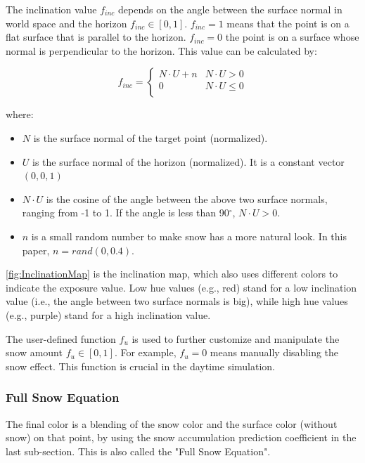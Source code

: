 \documentclass{article}
\begin{document}
The inclination value \( f_{inc} \) depends on the angle between the surface normal in world space and the
horizon \( f_{inc} \in [0, 1] \). \( f_{inc}=1 \) means that the point is on a flat surface that is parallel 
to the horizon. \( f_{inc}=0 \) the point is on a surface whose normal is perpendicular to the horizon. This
value can be calculated by:

\[
  f_{inc}=
  \left\{
    \begin{array}{ll}
      N \cdot U + n & N \cdot U > 0 \\
      0 & N \cdot U \leq 0 \\
    \end{array} 
  \right. 
\]

where:
\begin{itemize}
  \item \( N \) is the surface normal of the target point (normalized).
  \item \( U \) is the surface normal of the horizon (normalized). It is a constant vector \((0, 0, 1)\)
  \item \( N \cdot U \) is the cosine of the angle between the above two surface normals, ranging from 
  -1 to 1. If the angle is less than 90$^{\circ}$, \( N \cdot U > 0\).
  \item \( n \) is a small random number to make snow has a more natural look. In this paper, 
  \(n = rand(0, 0.4)\).
\end{itemize}

\ref{fig:InclinationMap} is the inclination map, which also uses different colors to indicate the exposure value. 
Low hue values (e.g., red) stand for a low inclination value (i.e., the angle between two surface normals is big),
while high hue values (e.g., purple) stand for a high inclination value.

The user-defined function \( f_{u} \) is used to further customize and manipulate the snow amount 
\( f_{u} \in [0, 1] \). For example, \( f_{u}=0 \) means manually disabling the snow effect. This function is crucial 
in the daytime simulation.

\subsubsection {Full Snow Equation}
The final color is a blending of the snow color and the surface color (without snow) on that point, by using the snow
accumulation prediction coefficient in the last sub-section. This is also called the "Full Snow Equation".
\end{document}
